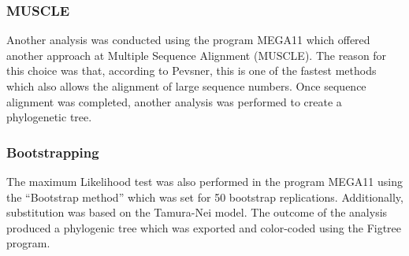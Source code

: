 \subsubsection{MUSCLE}
Another analysis was conducted using the program MEGA11 which offered another approach at Multiple Sequence Alignment (MUSCLE). 
The reason for this choice was that, according to Pevsner, this is one of the fastest methods which also allows the alignment of large sequence numbers.\cite{pevsner_2015_bioinformatics}
Once sequence alignment was completed, another analysis was performed to create a phylogenetic tree. 
\subsubsection{Bootstrapping}
The maximum Likelihood test was also performed in the program MEGA11 using the “Bootstrap method” which was set for 50 bootstrap replications.
Additionally, substitution was based on the Tamura-Nei model. 
The outcome of the analysis produced a phylogenic tree which was exported and color-coded using the Figtree program.
